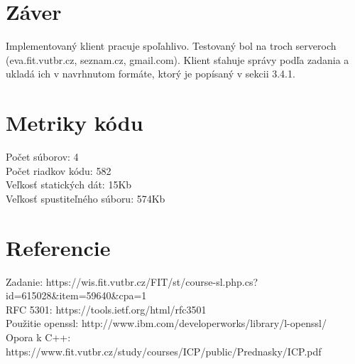 \documentclass{article}
\begin{document}
\section{Záver}
Implementovaný klient pracuje spoľahlivo. Testovaný bol na troch serveroch (eva.fit.vutbr.cz, seznam.cz, gmail.com). Klient sťahuje správy podľa zadania a ukladá ich v navrhnutom formáte, ktorý je popísaný v sekcii 3.4.1.
\section{Metriky kódu}
Počet súborov:      4\\
Počet riadkov kódu: 582\\
Veľkosť statických dát: 15Kb\\
Veľkosť spustiteľného súboru:  574Kb\\

\section{Referencie}
Zadanie: https://wis.fit.vutbr.cz/FIT/st/course-sl.php.cs?id=615028\&item=59640\&cpa=1\\
RFC 5301: https://tools.ietf.org/html/rfc3501\\
Použitie openssl: http://www.ibm.com/developerworks/library/l-openssl/\\
Opora k C++: https://www.fit.vutbr.cz/study/courses/ICP/public/Prednasky/ICP.pdf\\
\end{document}
